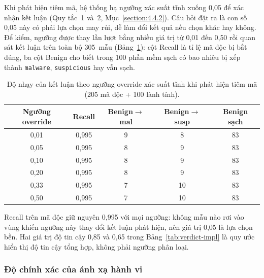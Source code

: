 \documentclass[../DoAn.tex]{subfiles}
\begin{document}
Khi phát hiện tiêm mã, hệ thống hạ ngưỡng xác suất tĩnh xuống 0{,}05 để xác
nhận kết luận (Quy tắc~1 và~2, Mục~\ref{section:4.4.2}). Câu hỏi đặt ra là
con số 0{,}05 này có phải lựa chọn may rủi, dễ làm đổi kết quả nếu chọn khác
hay không. Để kiểm, ngưỡng được thay lần lượt bằng nhiều giá trị từ 0{,}01
đến 0{,}50 rồi quan sát kết luận trên toàn bộ 305~mẫu
(Bảng~\ref{tab:override-sensitivity}): cột Recall là tỉ lệ mã độc bị bắt
đúng, ba cột Benign cho biết trong 100 phần mềm sạch có bao nhiêu bị xếp
thành \texttt{malware}, \texttt{suspicious} hay vẫn sạch.
\begin{table}[H]
\centering
\caption{Độ nhạy của kết luận theo ngưỡng override xác suất tĩnh khi phát
  hiện tiêm mã (205 mã độc + 100 lành tính).}
\label{tab:override-sensitivity}
\begin{tabular}{|c|c|c|c|c|}
\hline
\multicolumn{1}{|c|}{\textbf{Ngưỡng override}} & \multicolumn{1}{c|}{\textbf{Recall}} & \multicolumn{1}{c|}{\textbf{Benign$\to$mal}} & \multicolumn{1}{c|}{\textbf{Benign$\to$susp}} & \multicolumn{1}{c|}{\textbf{Benign sạch}} \\
\hline
0{,}01 & 0{,}995 & 9 & 8 & 83 \\
\hline
0{,}05 & 0{,}995 & 8 & 9 & 83 \\
\hline
0{,}10 & 0{,}995 & 8 & 9 & 83 \\
\hline
0{,}20 & 0{,}995 & 8 & 9 & 83 \\
\hline
0{,}33 & 0{,}995 & 7 & 10 & 83 \\
\hline
0{,}50 & 0{,}995 & 7 & 10 & 83 \\
\hline
\end{tabular}
\end{table}
Recall trên mã độc giữ nguyên 0{,}995 với mọi ngưỡng: không mẫu nào rơi vào
vùng khiến ngưỡng này thay đổi kết luận phát hiện, nên giá trị 0{,}05 là lựa
chọn bền. Hai giá trị độ tin cậy 0{,}85 và 0{,}65 trong
Bảng~\ref{tab:verdict-impl} là quy ước hiển thị độ tin cậy tổng hợp, không
phải ngưỡng phân loại.

\subsubsection*{Độ chính xác của ánh xạ hành vi}
\end{document}
